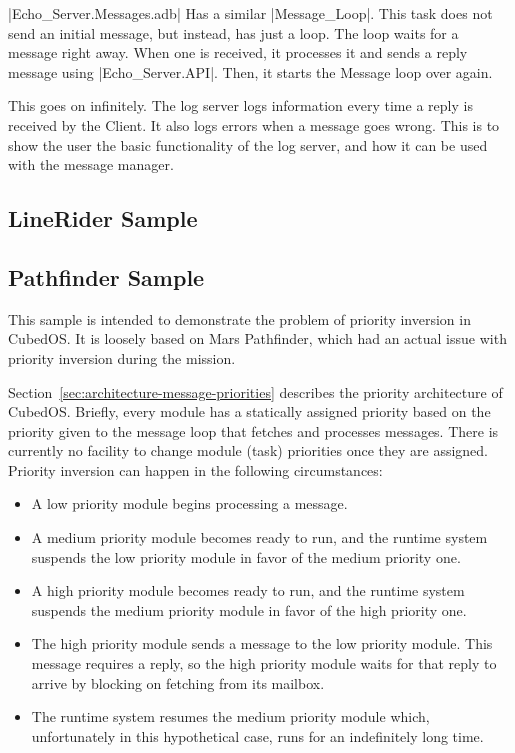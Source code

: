 |Echo_Server.Messages.adb| Has a similar |Message_Loop|. This task does not send an initial
message, but instead, has just a loop. The loop waits for a message right away. When one is
received, it processes it and sends a reply message using |Echo_Server.API|. Then, it starts the
Message loop over again. 

This goes on infinitely. The log server logs information every time a reply is received by the
Client. It also logs errors when a message goes wrong. This is to show the user the basic
functionality of the log server, and how it can be used with the message manager.


\subsection{LineRider Sample}
\label{sec:manual-linerider-sample}



\subsection{Pathfinder Sample}
\label{sec:manual-pathfinder-sample}

This sample is intended to demonstrate the problem of priority inversion in CubedOS. It is
loosely based on Mars Pathfinder, which had an actual issue with priority inversion during the
mission.

Section~\ref{sec:architecture-message-priorities} describes the priority architecture of
CubedOS. Briefly, every module has a statically assigned priority based on the priority given to
the message loop that fetches and processes messages. There is currently no facility to change
module (task) priorities once they are assigned. Priority inversion can happen in the following
circumstances:

\begin{itemize}

\item A low priority module begins processing a message.

\item A medium priority module becomes ready to run, and the runtime system suspends the low
priority module in favor of the medium priority one.

\item A high priority module becomes ready to run, and the runtime system suspends the medium
priority module in favor of the high priority one.

\item The high priority module sends a message to the low priority module. This message requires
a reply, so the high priority module waits for that reply to arrive by blocking on fetching from
its mailbox.

\item The runtime system resumes the medium priority module which, unfortunately in this
hypothetical case, runs for an indefinitely long time.

\end{itemize}

